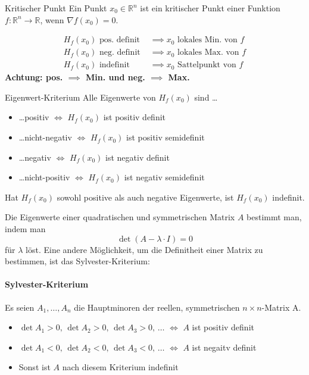 \documentclass[a4paper,10pt]{article}
\def\R{\mathbb{R}}
\begin{document}
\begin{mainbox}{Kritischer Punkt}
    Ein Punkt \( x_0 \in \R^n \) ist ein kritischer Punkt einer Funktion \( f: \R^n \to \R \), wenn \( \nabla f(x_0) = 0 \).
\end{mainbox}

\begin{subbox}{}
    \begin{align*}
        H_f(x_0) \text{ pos. definit } &\implies x_0 \text{ lokales Min. von } f \\
        H_f(x_0) \text{ neg. definit } &\implies x_0 \text{ lokales Max. von } f \\
        H_f(x_0) \text{ indefinit } &\implies x_0 \text{ Sattelpunkt von } f
    \end{align*}
    \textbf{Achtung: pos. \( \implies \) Min. und neg. \( \implies \) Max.}
\end{subbox}

\begin{subbox}{Eigenwert-Kriterium}
    Alle Eigenwerte von \( H_f(x_0) \) sind \dots
    \begin{itemize}
        \item \dots positiv \( \iff \) \( H_f(x_0) \) ist positiv definit
        \item \dots nicht-negativ \( \iff \) \( H_f(x_0) \) ist positiv semidefinit
        \item \dots negativ \( \iff \) \( H_f(x_0) \) ist negativ definit
        \item \dots nicht-positiv \( \iff \) \( H_f(x_0) \) ist negativ semidefinit
    \end{itemize}
    Hat \( H_f(x_0) \) sowohl positive als auch negative Eigenwerte, ist \( H_f(x_0) \) indefinit.
\end{subbox}

Die Eigenwerte einer quadratischen und symmetrischen Matrix \( A \) bestimmt man, indem man
\[
    \det(A - \lambda \cdot I) = 0
\]
für \( \lambda \) löst. Eine andere Möglichkeit, um die Definitheit einer Matrix zu bestimmen, ist das Sylvester-Kriterium:

\paragraph{Sylvester-Kriterium}
Es seien \( A_1, \dots, A_n \) die Hauptminoren der reellen, symmetrischen \( n \times n \)-Matrix A.
\begin{itemize}
    \item \( \det A_1 > 0, \, \det A_2 > 0, \, \det A_3 > 0, \, \dots \) \( \iff \) \( A \) ist positiv definit
    \item \( \det A_1 < 0, \, \det A_2 < 0, \, \det A_3 < 0, \, \dots \) \( \iff \) \( A \) ist negaitv definit
    \item Sonst ist \( A \) nach diesem Kriterium indefinit
\end{itemize}
\end{document}
